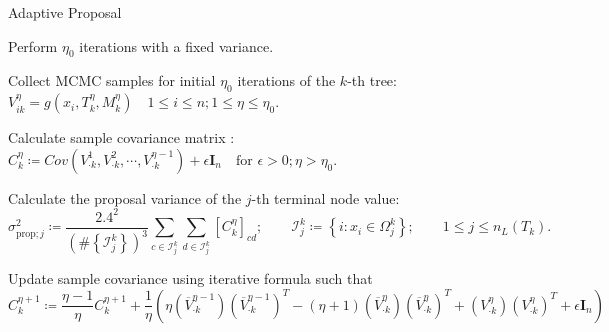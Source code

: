\documentclass[11pt]{beamer}
\begin{document}
    \begin{frame}{Adaptive Proposal}
    \centering
        {\begin{algorithm}[H]
        \tiny
	\caption{Computation of adaptive proposal}\label{alg:ada:prop}
	\begin{algorithmic}[1]
		\State Perform $\eta_0$ iterations with a fixed variance.
		
		\State Collect MCMC samples for initial $\eta_0$ iterations of the $k$-th tree: $V_{ik}^{\eta} = g\left(x_i,T_k^{\eta},M_k^{\eta}\right)\quad 1\le i \le n; 1\le \eta \le \eta_0$.
		
		\State Calculate sample covariance matrix : $C_k^{\eta} \coloneqq Cov\left(V_{\cdot k}^{1},V_{\cdot k}^{2},\cdots,V_{\cdot k}^{\eta-1}\right) + \epsilon\mathbf{I}_n \quad \text{for } \epsilon>0; \eta>\eta_0$.
		
		\State Calculate the proposal variance of the $j$-th terminal node value:
		\begin{equation*}
			\sigma_{\text{prop};j}^2 \coloneqq \frac{2.4^2}{\left(\#\left\{\mathcal{I}_{j}^{k}\right\}\right)^3}
			\sum_{c\in\mathcal{I}_{j}^{k}}\sum_{d\in\mathcal{I}_{j}^{k}}\left[C_k^{\eta}\right]_{cd};\qquad\mathcal{I}_{j}^{k}\coloneqq \left\{i:x_i\in \Omega_{j}^{k}\right\};\qquad 1\le j\le n_L(T_k).
		\end{equation*}
		
		\EndFor
		
		\State Update sample covariance using iterative formula such that
		\begin{equation*}
			C_k^{\eta+1} \coloneqq \frac{\eta-1}{\eta} C_k^{\eta+1} + \frac{1}{\eta}\left(\eta \left(\overline{V}_{\cdot k}^{\eta-1}\right)\left(\overline{V}_{\cdot k}^{\eta-1}\right)^T - (\eta+1)\left(\overline{V}_{\cdot k}^{\eta}\right)\left(\overline{V}_{\cdot k}^{\eta}\right)^T + \left({V}_{\cdot k}^{\eta}\right)\left({V}_{\cdot k}^{\eta}\right)^T + \epsilon\mathbf{I}_n\right)
		\end{equation*}
	\end{algorithmic}
\end{algorithm}}

    \end{frame}
    
\end{document}
